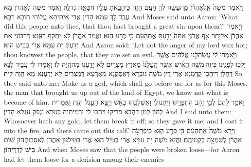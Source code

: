{וַיֹּ֤אמֶר מֹשֶׁה֙ אֶֽל\maqqaf אַהֲרֹ֔ן מֶֽה\maqqaf עָשָׂ֥ה לְךָ֖ הָעָ֣ם הַזֶּ֑ה כִּֽי\maqqaf הֵבֵ֥אתָ עָלָ֖יו חֲטָאָ֥ה גְדֹלָֽה׃}
{וַאֲמַר מֹשֶׁה לְאַהֲרֹן מָא עֲבַד לָךְ עַמָּא הָדֵין אֲרֵי אֵיתִיתָא עֲלוֹהִי חוֹבָא רַבָּא׃}
{And Moses said unto Aaron: ‘What did this people unto thee, that thou hast brought a great sin upon them?’}{}
{וַיֹּ֣אמֶר אַהֲרֹ֔ן אַל\maqqaf יִ֥חַר אַ֖ף אֲדֹנִ֑י אַתָּה֙ יָדַ֣עְתָּ אֶת\maqqaf הָעָ֔ם כִּ֥י בְרָ֖ע הֽוּא׃}
{וַאֲמַר אַהֲרֹן לָא יִתְקַף רוּגְזָא דְּרִבּוֹנִי אַתְּ יְדַעְתְּ יָת עַמָּא אֲרֵי בְּבִישׁ הוּא׃}
{And Aaron said: ‘Let not the anger of my lord wax hot; thou knowest the people, that they are set on evil.}{}
{וַיֹּ֣אמְרוּ לִ֔י עֲשֵׂה\maqqaf לָ֣נוּ אֱלֹהִ֔ים אֲשֶׁ֥ר יֵלְכ֖וּ לְפָנֵ֑ינוּ כִּי\maqqaf זֶ֣ה \legarmeh  מֹשֶׁ֣ה הָאִ֗ישׁ אֲשֶׁ֤ר הֶֽעֱלָ֙נוּ֙ מֵאֶ֣רֶץ מִצְרַ֔יִם לֹ֥א יָדַ֖עְנוּ מֶה\maqqaf הָ֥יָה לֽוֹ׃}
{וַאֲמַרוּ לִי עֲבֵיד לַנָא דַּחְלָן דִּיהָכָן קֳדָמַנָא אֲרֵי דֵין מֹשֶׁה גּוּבְרָא דְּאַסְּקַנָא מֵאַרְעָא דְּמִצְרַיִם לָא יְדַעְנָא מָא הֲוָה לֵיהּ׃}
{So they said unto me: Make us a god, which shall go before us; for as for this Moses, the man that brought us up out of the land of Egypt, we know not what is become of him.}{}
{וָאֹמַ֤ר לָהֶם֙ לְמִ֣י זָהָ֔ב הִתְפָּרָ֖קוּ וַיִּתְּנוּ\maqqaf לִ֑י וָאַשְׁלִכֵ֣הוּ בָאֵ֔שׁ וַיֵּצֵ֖א הָעֵ֥גֶל הַזֶּֽה׃}
{וַאֲמַרִית לְהוֹן לְמַן דַּהְבָּא פָּרִיקוּ וִיהַבוּ לִי וּרְמֵיתֵיהּ בְּנוּרָא וּנְפַק עִגְלָא הָדֵין׃}
{And I said unto them: Whosoever hath any gold, let them break it off; so they gave it me; and I cast it into the fire, and there came out this calf.’}{}
{וַיַּ֤רְא מֹשֶׁה֙ אֶת\maqqaf הָעָ֔ם כִּ֥י פָרֻ֖עַ ה֑וּא כִּֽי\maqqaf פְרָעֹ֣ה אַהֲרֹ֔ן לְשִׁמְצָ֖ה בְּקָמֵיהֶֽם׃}
{וַחֲזָא מֹשֶׁה יָת עַמָּא אֲרֵי בְּטִיל הוּא אֲרֵי בַּטֵּילִנּוּן אַהֲרֹן לְאַסָּבוּתְהוֹן שׁוֹם בִּישׁ לְדָרֵיהוֹן׃}
{And when Moses saw that the people were broken loose—for Aaron had let them loose for a derision among their enemies—}{}
